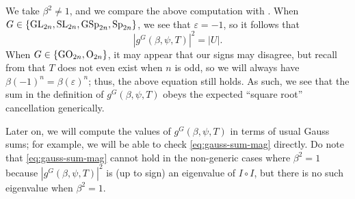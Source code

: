 \begin{remark}
	We take $\beta^2\ne1$, and we compare the above computation with . When $G\in\{\mathrm{GL}_{2n},\mathrm{SL}_{2n},\mathrm{GSp}_{2n},\mathrm{Sp}_{2n}\}$, we see that $\varepsilon=-1$, so it follows that
	\begin{equation}
		\left|g^G(\beta,\psi,T)\right|^2=\left|U\right|. \label{eq:gauss-sum-mag}
	\end{equation}
	When $G\in\{\mathrm{GO}_{2n},\mathrm{O}_{2n}\}$, it may appear that our signs may disagree, but recall from  that $T$ does not even exist when $n$ is odd, so we will always have $\beta(-1)^n=\beta(\varepsilon)^n$; thus, the above equation still holds. As such, we see that the sum in the definition of $g^G(\beta,\psi,T)$ obeys the expected ``square root'' cancellation generically.
\end{remark}
\begin{remark}
	Later on, we will compute the values of $g^G(\beta,\psi,T)$ in terms of usual Gauss sums; for example, we will be able to check \eqref{eq:gauss-sum-mag} directly. Do note that \eqref{eq:gauss-sum-mag} cannot hold in the non-generic cases where $\beta^2=1$ because $\left|g^G(\beta,\psi,T)\right|^2$ is (up to sign) an eigenvalue of $I\circ I$, but there is no such eigenvalue when $\beta^2=1$.
\end{remark}
